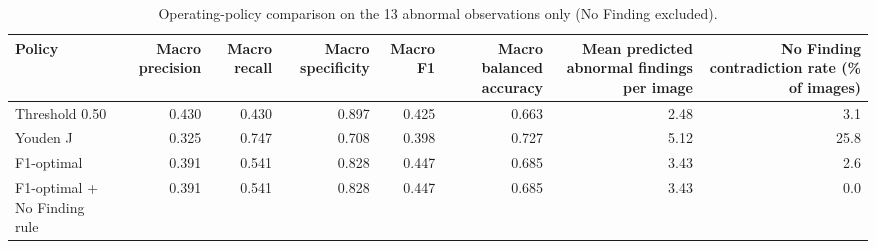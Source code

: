 \begin{table}[t]
\centering
\small
\begin{tabular}{lrrrrrrr}
\hline
Policy & Macro precision & Macro recall & Macro specificity & Macro F1 & Macro balanced accuracy & Mean predicted abnormal findings per image & No Finding contradiction rate (\% of images) \\
\hline
Threshold 0.50 & 0.430 & 0.430 & 0.897 & 0.425 & 0.663 & 2.48 & 3.1 \\
Youden J & 0.325 & 0.747 & 0.708 & 0.398 & 0.727 & 5.12 & 25.8 \\
F1-optimal & 0.391 & 0.541 & 0.828 & 0.447 & 0.685 & 3.43 & 2.6 \\
F1-optimal + No Finding rule & 0.391 & 0.541 & 0.828 & 0.447 & 0.685 & 3.43 & 0.0 \\
\hline
\end{tabular}
\caption{Operating-policy comparison on the 13 abnormal observations only (No Finding excluded).}
\label{tab:table1b_policy_comparison_13_abnormal}
\end{table}
